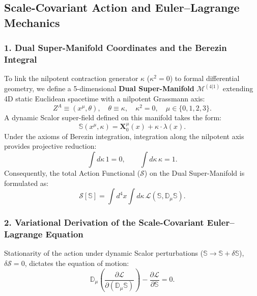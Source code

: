 \subsection{Scale-Covariant Action and Euler--Lagrange Mechanics}
\label{sec:olcek_lagrange_ana}

\subsubsection{1. Dual Super-Manifold Coordinates and the Berezin Integral}
To link the nilpotent contraction generator $\kappa$ ($\kappa^2 = 0$) to formal differential geometry, we define a 5-dimensional \textbf{Dual Super-Manifold} $\mathcal{M}^{(4|1)}$ extending 4D static Euclidean spacetime with a nilpotent Grassmann axis:
\begin{equation}
    Z^A \equiv \left( x^\mu, \theta \right), \quad \theta \equiv \kappa, \quad \kappa^2 = 0, \quad \mu \in \{0, 1, 2, 3\}.
    \label{eq:super_koordinat}
\end{equation}
A dynamic Scalor super-field defined on this manifold takes the form:
\begin{equation}
    \mathbb{S}\left(x^\mu, \kappa\right) = \mathbf{X}_0^\mu(x) + \kappa \cdot \lambda(x).
    \label{eq:skalor_super_alan}
\end{equation}
Under the axioms of Berezin integration, integration along the nilpotent axis provides projective reduction:
\begin{equation}
    \int d\kappa \, 1 = 0, \qquad \int d\kappa \, \kappa = 1.
    \label{eq:berezin_kurallari}
\end{equation}
Consequently, the total Action Functional ($\mathcal{S}$) on the Dual Super-Manifold is formulated as:
\begin{equation}
    \mathcal{S}[\mathbb{S}] = \int d^4x \int d\kappa \, \mathcal{L}\left(\mathbb{S}, \mathbb{D}_\mu \mathbb{S}\right).
    \label{eq:skalor_eylem_fonksiyoneli}
\end{equation}

\subsubsection{2. Variational Derivation of the Scale-Covariant Euler--Lagrange Equation}
\begin{theorem}
    \label{thm:euler_lagrange_ispat}
    Stationarity of the action under dynamic Scalor perturbations ($\mathbb{S} \to \mathbb{S} + \delta \mathbb{S}$), $\delta \mathcal{S} = 0$, dictates the equation of motion:
    \begin{equation}
        \mathbb{D}_\mu \left( \frac{\partial \mathcal{L}}{\partial (\mathbb{D}_\mu \mathbb{S})} \right) - \frac{\partial \mathcal{L}}{\partial \mathbb{S}} = 0.
        \label{eq:euler_lagrange_tam_denklem}
    \end{equation}
\end{theorem}

